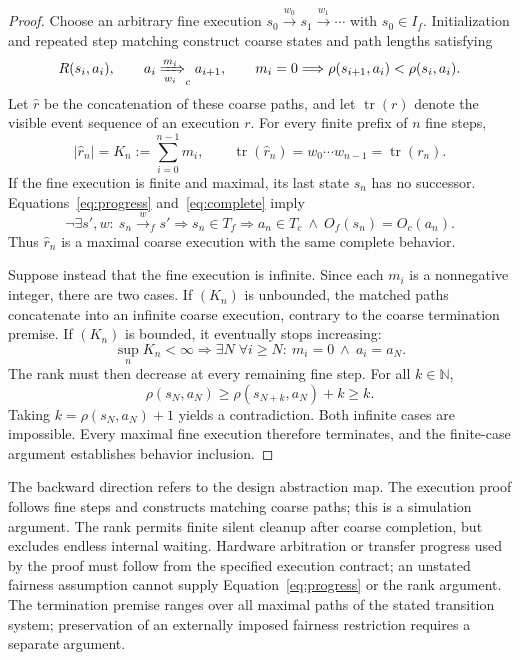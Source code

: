 \documentclass[11pt]{article}
\begin{document}
\begin{proof}
Choose an arbitrary fine execution $s_0\xrightarrow{w_0}s_1\xrightarrow{w_1}\cdots$ with $s_0\in I_f$. Initialization and repeated step matching construct coarse states and path lengths satisfying
\begin{equation}
 R(s_i,a_i),\qquad
 a_i\xRightarrow[w_i]{m_i}_c a_{i+1},\qquad
 m_i=0\Longrightarrow\rho(s_{i+1},a_i)<\rho(s_i,a_i).
 \label{eq:matching-sequence}
\end{equation}
Let $\widehat r$ be the concatenation of these coarse paths, and let $\operatorname{tr}(r)$ denote the visible event sequence of an execution $r$. For every finite prefix of $n$ fine steps,
\begin{equation}
 |\widehat r_n|=K_n:=\sum_{i=0}^{n-1}m_i,
 \qquad
 \operatorname{tr}(\widehat r_n)=w_0\cdots w_{n-1}
 =\operatorname{tr}(r_n).
 \label{eq:trace-prefix}
\end{equation}
If the fine execution is finite and maximal, its last state $s_n$ has no successor. Equations~\ref{eq:progress} and~\ref{eq:complete} imply
\begin{equation}
 \neg\exists s',w:\ s_n\xrightarrow{w}_f s'
 \Longrightarrow s_n\in T_f
 \Longrightarrow a_n\in T_c\ \land\ O_f(s_n)=O_c(a_n).
 \label{eq:finite-completion}
\end{equation}
Thus $\widehat r_n$ is a maximal coarse execution with the same complete behavior.

Suppose instead that the fine execution is infinite. Since each $m_i$ is a nonnegative integer, there are two cases. If $(K_n)$ is unbounded, the matched paths concatenate into an infinite coarse execution, contrary to the coarse termination premise. If $(K_n)$ is bounded, it eventually stops increasing:
\begin{equation}
 \sup_n K_n<\infty
 \Longrightarrow\exists N\;\forall i\ge N:\ m_i=0\ \land\ a_i=a_N.
\end{equation}
The rank must then decrease at every remaining fine step. For all $k\in\mathbb N$,
\begin{equation}
 \rho(s_N,a_N)\ge\rho(s_{N+k},a_N)+k\ge k.
\end{equation}
Taking $k=\rho(s_N,a_N)+1$ yields a contradiction. Both infinite cases are impossible. Every maximal fine execution therefore terminates, and the finite-case argument establishes behavior inclusion.
\end{proof}

The backward direction refers to the design abstraction map. The execution proof follows fine steps and constructs matching coarse paths; this is a simulation argument. The rank permits finite silent cleanup after coarse completion, but excludes endless internal waiting. Hardware arbitration or transfer progress used by the proof must follow from the specified execution contract; an unstated fairness assumption cannot supply Equation~\ref{eq:progress} or the rank argument. The termination premise ranges over all maximal paths of the stated transition system; preservation of an externally imposed fairness restriction requires a separate argument.
\end{document}
